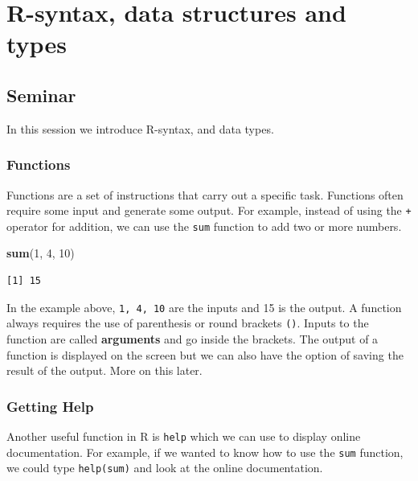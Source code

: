 \documentclass[]{article}
\newenvironment{Shaded}{\begin{snugshade}}{\end{snugshade}}
\newcommand{\DecValTok}[1]{\textcolor[rgb]{0.00,0.00,0.81}{#1}}
\newcommand{\KeywordTok}[1]{\textcolor[rgb]{0.13,0.29,0.53}{\textbf{#1}}}
\newcommand{\NormalTok}[1]{#1}
\begin{document}
\hypertarget{r-syntax-data-structures-and-types}{%
\section{R-syntax, data structures and types}\label{r-syntax-data-structures-and-types}}

\hypertarget{seminar}{%
\subsection{Seminar}\label{seminar}}

In this session we introduce R-syntax, and data types.

\hypertarget{functions}{%
\subsubsection{Functions}\label{functions}}

Functions are a set of instructions that carry out a specific task. Functions often require some input and generate some output. For example, instead of using the \texttt{+} operator for addition, we can use the \texttt{sum} function to add two or more numbers.

\begin{Shaded}
\begin{Highlighting}[]
\KeywordTok{sum}\NormalTok{(}\DecValTok{1}\NormalTok{, }\DecValTok{4}\NormalTok{, }\DecValTok{10}\NormalTok{)}
\end{Highlighting}
\end{Shaded}

\begin{verbatim}
[1] 15
\end{verbatim}

In the example above, \texttt{1,\ 4,\ 10} are the inputs and 15 is the output. A function always requires the use of parenthesis or round brackets \texttt{()}. Inputs to the function are called \textbf{arguments} and go inside the brackets. The output of a function is displayed on the screen but we can also have the option of saving the result of the output. More on this later.

\hypertarget{getting-help}{%
\subsubsection{Getting Help}\label{getting-help}}

Another useful function in R is \texttt{help} which we can use to display online documentation. For example, if we wanted to know how to use the \texttt{sum} function, we could type \texttt{help(sum)} and look at the online documentation.
\end{document}
